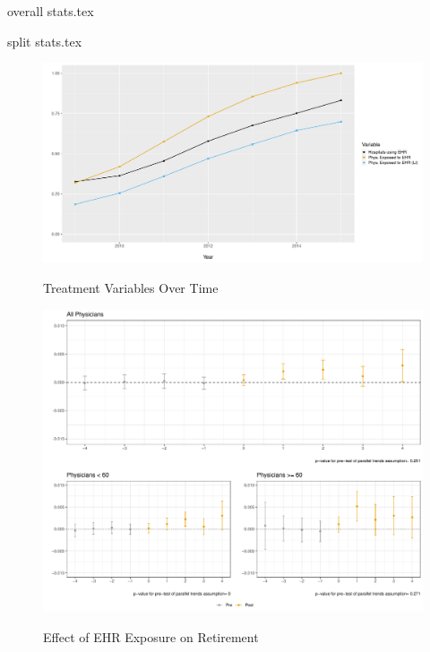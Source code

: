 \documentclass[11pt]{article}
\begin{document}
{overall stats.tex}

{split stats.tex}

\begin{figure}[p]
\centering
    \caption{Treatment Variables Over Time}
    \includegraphics[scale=.55]{Objects/sum_stats_year.pdf}
    \label{fig:treatmentgraph}
\end{figure}

\begin{figure}[p]
    \centering
    \caption{Effect of EHR Exposure on Retirement}
    \includegraphics[scale=.57]{Objects/retire_plot.pdf}
    \label{fig:retirefirst}
\end{figure}
\end{document}
